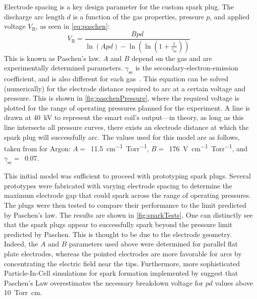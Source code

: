             Electrode spacing is a key design parameter for the custom spark plug. The discharge arc length $d$ is a function of the gas properties, pressure $p$, and applied voltage $V_\mathrm{B}$, as seen in \autoref{eq:paschen}:
            \begin{equation}
                V_\mathrm{B} = \frac{Bpd}{\ln{(Apd)}-\ln{\left(\ln{\left(1+\frac{1}{\gamma_\mathrm{se}}\right)}\right)}}
                \label{eq:paschen}
            \end{equation}
            This is known as Paschen's law. $A$ and $B$ depend on the gas and are experimentally determined parameters. $\gamma_\mathrm{se}$ is the secondary-electron-emission coefficient, and is also different for each gas~\cite{liebermanPrinciplesPlasmaDischarges2005}. This equation can be solved (numerically) for the electrode distance required to arc at a certain voltage and pressure. This is shown in \autoref{fig:paschenPressure}, where the required voltage is plotted for the range of operating pressures planned for the experiment. A line is drawn at \qty{40}{kV} to represent the smart coil's output---in theory, as long as this line intersects all pressure curves, there exists an electrode distance at which the spark plug will successfully arc. The values used for this model are as follows, taken from \textcite{liebermanPrinciplesPlasmaDischarges2005,theisComputingPaschenCurve2021} for Argon: $A =$~\qty{11.5}{cm^{-1}.Torr^{-1}}, $B =$~\qty{176}{V.cm^{-1}.Torr^{-1}}, and $\gamma_\mathrm{se} =$~0.07.

            This initial model was sufficient to proceed with prototyping spark plugs. Several prototypes were fabricated with varying electrode spacing to determine the maximum electrode gap that could spark across the range of operating pressures. The plugs were then tested to compare their performance to the limit predicted by Paschen's law. The results are shown in \autoref{fig:sparkTests}. One can distinctly see that the spark plugs appear to successfully spark beyond the pressure limit predicted by Paschen. This is thought to be due to the electrode geometry. Indeed, the $A$ and $B$ parameters used above were determined for parallel flat plate electrodes, whereas the pointed electrodes are more favorable for arcs by concentrating the electric field near the tips. Furthermore, more sophisticated Particle-In-Cell simulations for spark formation implemented by \textcite{theisComputingPaschenCurve2021} suggest that Paschen's Law overestimates the necessary breakdown voltage for $pd$ values above \qty{10}{Torr.cm}.

